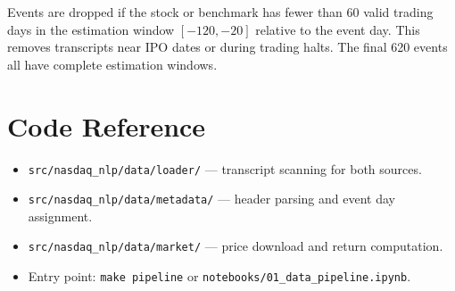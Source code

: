 \documentclass[12pt,a4paper]{article}
\begin{document}
Events are dropped if the stock or benchmark has fewer than 60 valid trading days
in the estimation window $[-120, -20]$ relative to the event day.
This removes transcripts near IPO dates or during trading halts.
The final 620 events all have complete estimation windows.

\section{Code Reference}

\begin{itemize}
  \item \texttt{src/nasdaq\_nlp/data/loader/} --- transcript scanning for both sources.
  \item \texttt{src/nasdaq\_nlp/data/metadata/} --- header parsing and event day assignment.
  \item \texttt{src/nasdaq\_nlp/data/market/} --- price download and return computation.
  \item Entry point: \texttt{make pipeline} or \texttt{notebooks/01\_data\_pipeline.ipynb}.
\end{itemize}
\end{document}
